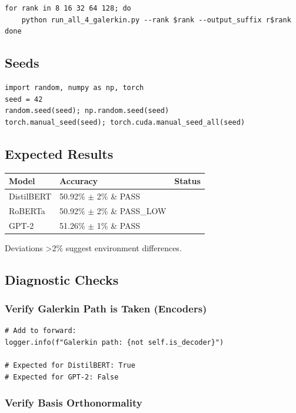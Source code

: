 \begin{lstlisting}
for rank in 8 16 32 64 128; do
    python run_all_4_galerkin.py --rank $rank --output_suffix r$rank
done
\end{lstlisting}

\subsection{Seeds}

\begin{lstlisting}
import random, numpy as np, torch
seed = 42
random.seed(seed); np.random.seed(seed)
torch.manual_seed(seed); torch.cuda.manual_seed_all(seed)
\end{lstlisting}

\subsection{Expected Results}

\begin{table}[H]
\centering
\small
\begin{tabular}{lll}
\toprule
\textbf{Model} & \textbf{Accuracy} & \textbf{Status} \\
\midrule
DistilBERT & 50.92\% $\pm$ 2\% \& PASS \\
RoBERTa & 50.92\% $\pm$ 2\% \& PASS\_LOW \\
GPT-2 & 51.26\% $\pm$ 1\% \& PASS \\
\bottomrule
\end{tabular}
\end{table}

Deviations >2\% suggest environment differences.

\subsection{Diagnostic Checks}

\subsubsection{Verify Galerkin Path is Taken (Encoders)}

\begin{lstlisting}
# Add to forward:
logger.info(f"Galerkin path: {not self.is_decoder}")

# Expected for DistilBERT: True
# Expected for GPT-2: False
\end{lstlisting}

\subsubsection{Verify Basis Orthonormality}

